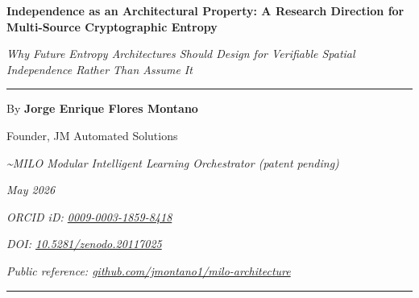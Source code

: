 \documentclass[11pt,letterpaper,oneside]{article}
\newcommand{\milotitle}{Independence as an Architectural Property: A Research Direction for Multi-Source Cryptographic Entropy}
\newcommand{\milosubtitle}{Why Future Entropy Architectures Should Design for Verifiable Spatial Independence Rather Than Assume It}
\newcommand{\milodate}{May 2026}
\begin{document}
\thispagestyle{titlepage}
\begin{center}
\vspace*{0.2in}
{\sffamily\Large\bfseries\color{milonavy} \milotitle\par}
\vspace{0.15in}
{\itshape\normalsize \milosubtitle\par}
\vspace{0.18in}
{\color{milonavy}\rule{0.35\textwidth}{0.8pt}\par}
\vspace{0.18in}
{\large By \textbf{Jorge Enrique Flores Montano}\par}
{\normalsize Founder, JM Automated Solutions\par}
{\small\itshape\textcolor{black!70}{\textasciitilde MILO\texttrademark{} \textemdash{} Modular Intelligent Learning Orchestrator (patent pending)}\par}
{\small\itshape\textcolor{black!70}{\milodate}\par}
{\small\itshape\textcolor{black!70}{ORCID iD: \href{https://orcid.org/0009-0003-1859-8418}{0009-0003-1859-8418}}\par}
{\small\itshape\textcolor{black!70}{DOI: \href{https://doi.org/10.5281/zenodo.20117025}{10.5281/zenodo.20117025}}\par}
{\small\itshape\textcolor{black!70}{Public reference: \href{https://github.com/jmontano1/milo-architecture}{github.com/jmontano1/milo-architecture}}\par}
\vspace{0.15in}
{\color{milonavy}\rule{\textwidth}{0.6pt}\par}
\end{center}


\end{document}
